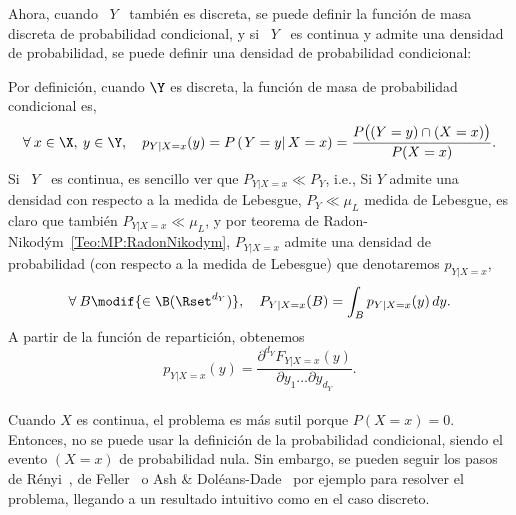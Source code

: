 Ahora, cuando  \ $Y$ \ tambi\'en es  discreta, se puede definir  la funci\'on de
masa discreta de probabilidad condicional, y si \ $Y$ \ es continua y admite una
densidad  de  probabilidad,  se  puede  definir  una  densidad  de  probabilidad
condicional:
%
\begin{definicion}
\label{Def:MP:ReparticionCondicionalDiscreta}
%
  Por  definici\'on,  cuando  $\Y$  es   discreta,  la  funci\'on  de  masa  de
  probabilidad condicional  es,
  \[
  \forall \: x \in \X, \: y \in \Y, \quad p_{Y|X=x}(y) = P\left( \left. Y = y \right|
  X  =  x \right)  =  \frac{P\big(  (Y  = y)  \cap  (X =  x) \big)}{P(X = x)}.
  \]
  Si  \ $Y$  \  es continua,  es sencillo  ver  que $P_{Y|X=x}  \ll P_Y$,  i.e.,
     Si $Y$ admite una densidad con respecto  a la medida de
    Lebesgue,  $P_Y  \ll \mu_L$  medida  de  Lebesgue,  es claro  que  tambi\'en
    $P_{Y|X=x}       \ll       \mu_L$,        y       por       teorema       de
    Radon-Nikod\'ym~\ref{Teo:MP:RadonNikodym},  $P_{Y|X=x}$ admite  una densidad
    de  probabilidad (con  respecto a  la  medida de  Lebesgue) que  denotaremos
    $p_{Y|X=x}$,
  \[
  \forall  \:  B  \modif{\in   \B(\Rset^{d_Y})},  \quad  P_{Y|X=x}(B)  =  \int_B
  p_{Y|X=x}(y) \, dy.
  \]
  A partir de la funci\'on de repartici\'on, obtenemos
  \[
  p_{Y|X=x}(y) = \frac{\partial^{d_Y} F_{Y|X=x}(y)}{\partial y_1 \ldots \partial
    y_{d_Y}}.
  \]
\end{definicion}



\paragraph{}
Cuando  $X$  es   continua,  el  problema  es  m\'as   sutil  porque  $P(X=x)  =
0$. Entonces, no  se puede usar la definici\'on  de la probabilidad condicional,
siendo el  evento $(X=x)$ de probabilidad  nula.  Sin embargo,  se pueden seguir
los pasos de R\'enyi~\cite[Cap.~5]{Ren07}, de Feller~\cite[Cap.~10]{Fel71} o Ash
\&  Dol{\'e}ans-Dade~\cite[Sec.~5.3]{AshDol99}  por  ejemplo  para  resolver  el
problema, llegando  a un resultado intuitivo como
en el caso discreto.

